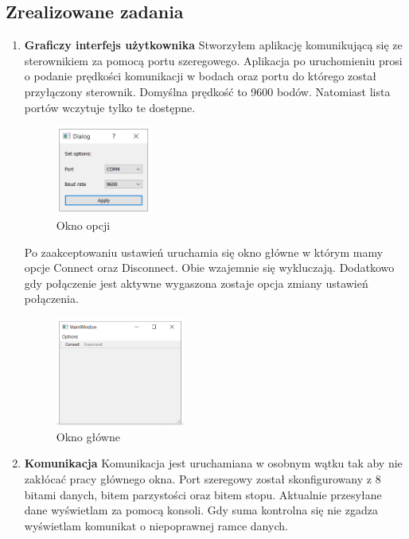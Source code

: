 \documentclass[10pt, a4paper]{article}
\begin{document}
		\subsection{Zrealizowane zadania}
			\begin{enumerate}
				\item \textbf{Graficzy interfejs użytkownika} \newline
				Stworzyłem aplikację komunikującą się ze sterownikiem za pomocą portu szeregowego. Aplikacja po uruchomieniu prosi o podanie prędkości komunikacji w bodach oraz portu do którego został przyłączony sterownik. Domyślna prędkość to 9600 bodów. Natomiast lista portów wczytuje tylko te dostępne.
				\begin{figure}[H]
					\centering
					\includegraphics[width=0.3\textwidth]{figures/opcje.png}
					\caption{Okno opcji}
					\label{fig:opcje}
				\end{figure}
				
				Po zaakceptowaniu ustawień uruchamia się okno główne w którym mamy opcje Connect oraz Disconnect. Obie wzajemnie się wykluczają. Dodatkowo gdy połączenie jest aktywne wygaszona zostaje opcja zmiany ustawień połączenia.
				
				\begin{figure}[H]
					\centering
					\includegraphics[width=0.4\textwidth]{figures/okno_glowne.png}
					\caption{Okno główne}
					\label{fig:okno_glowne}
				\end{figure}
			
				\item \textbf{Komunikacja} \newline
				Komunikacja jest uruchamiana w osobnym wątku tak aby nie zakłócać pracy głównego okna. Port szeregowy został skonfigurowany z 8 bitami danych, bitem parzystości oraz bitem stopu. Aktualnie przesyłane dane wyświetlam za pomocą konsoli. Gdy suma kontrolna się nie zgadza wyświetlam komunikat o niepoprawnej ramce danych.
			\end{enumerate}
		
\end{document}
